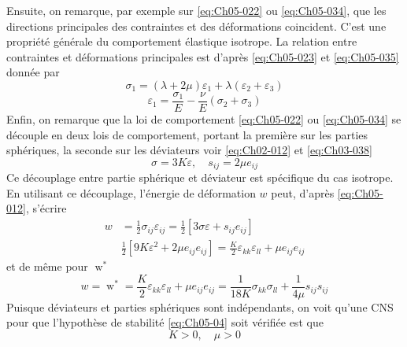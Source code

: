 Ensuite, on remarque, par exemple sur \eqref{eq:Ch05-022} ou \eqref{eq:Ch05-034}, que les directions principales des contraintes et des déformations coincident.
C'est une propriété générale du comportement élastique isotrope.
La relation entre contraintes et déformations principales est d'après \eqref{eq:Ch05-023} et \eqref{eq:Ch05-035} donnée par 
\begin{equation}
    \sigma_1 = \left( \lambda + 2 \mu \right) \varepsilon_1 + \lambda \left( \varepsilon_2 + \varepsilon_3 \right)
    \label{eq:Ch05-037}
\end{equation}
\begin{equation}
    \varepsilon_1 = \frac{\sigma_1}{E} - \frac{\nu}{E} \left( \sigma_2 + \sigma_3 \right)
    \label{eq:Ch05-038}
\end{equation}
Enfin, on remarque que la loi de comportement \eqref{eq:Ch05-022} ou \eqref{eq:Ch05-034} se découple en deux lois de comportement, portant la première sur les parties sphériques, la seconde sur les déviateurs voir \eqref{eq:Ch02-012} et \eqref{eq:Ch03-038} ­
\begin{equation}
    \sigma = 3 K \varepsilon , \quad s_{ij} = 2 \mu e_{ij}
    \label{eq:Ch05-039}
\end{equation}
Ce découplage entre partie sphérique et déviateur est spécifique du cas isotrope.
En utilisant ce découplage, l'énergie de déformation $w$ peut, d'après \eqref{eq:Ch05-012}, s'écrire 
\begin{equation*}
    \begin{split}
        w &= \frac{1}{2} \sigma_{ij} \varepsilon_{ij} = \frac{1}{2} \left[ 3 \sigma \varepsilon + s_{ij} e_{ij} \right] \\
        & \frac{1}{2} \left[ 9 K \varepsilon^2 + 2\mu e_{ij} e_{ij} \right] = \frac{K}{2} \varepsilon_{kk} \varepsilon_{ll} + \mu e_{ij} e_{ij}
    \end{split}
\end{equation*}
et de même pour $\mathop{w}^*$
\begin{equation}
    w=\mathop{w}^* = \frac{K}{2} \varepsilon_{kk} \varepsilon_{ll} + \mu e_{ij} e_{ij} = \frac{1}{18K} \sigma_{kk} \sigma_{ll} + \frac{1}{4\mu} s_{ij} s_{ij}
    \label{eq:Ch05-049}
\end{equation}
Puisque déviateurs et parties sphériques sont indépendants, on voit qu'une CNS pour que l'hypothèse de stabilité \eqref{eq:Ch05-04} soit vérifiée est que 
\begin{equation}
    K>0, \quad \mu >0
    \label{eq:Ch05-050}
\end{equation}
